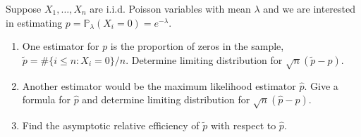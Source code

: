 \begin{exercise}\label{probability:2017:10}
Suppose $X_1, \dots, X_n$ are i.i.d. Poisson variables with mean $\lambda$ and we are interested in estimating $p = \mathbb{P}_\lambda(X_i = 0) = e^{-\lambda}$.
\begin{enumerate}
    \item[(a)] One estimator for $p$ is the proportion of zeros in the sample, $\tilde{p} = \# \{ i \leq n : X_i = 0 \} / n$. Determine limiting distribution for $\sqrt{n}(\tilde{p} - p)$.
    \item[(b)] Another estimator would be the maximum likelihood estimator $\hat{p}$. Give a formula for $\hat{p}$ and determine limiting distribution for $\sqrt{n}(\hat{p} - p)$.
    \item[(c)] Find the asymptotic relative efficiency of $\tilde{p}$ with respect to $\hat{p}$.
\end{enumerate}
\end{exercise}

